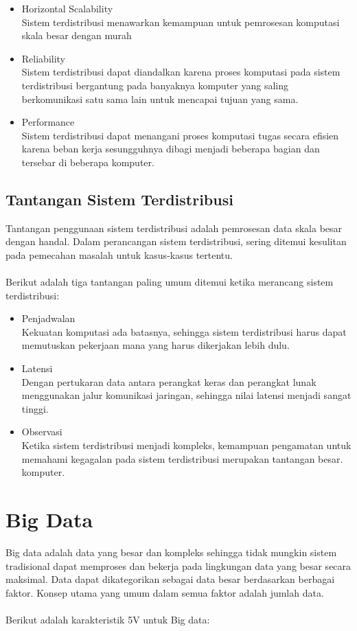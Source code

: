 \begin{itemize}
\item Horizontal Scalability\\
Sistem terdistribusi menawarkan kemampuan untuk  pemrosesan komputasi skala besar dengan murah

\item Reliability\\
Sistem terdistribusi dapat diandalkan karena proses komputasi pada sistem terdistribusi bergantung pada banyaknya komputer yang saling berkomunikasi satu sama lain untuk mencapai tujuan yang sama.
 
\item Performance\\
Sistem terdistribusi dapat menangani proses komputasi tugas secara efisien karena beban kerja sesungguhnya dibagi menjadi beberapa bagian dan tersebar di beberapa komputer. 
\end{itemize}

\subsection{Tantangan Sistem Terdistribusi} 
Tantangan penggunaan sistem terdistribusi adalah pemrosesan data skala besar dengan handal. Dalam perancangan sistem terdistribusi, sering ditemui kesulitan pada pemecahan masalah untuk kasus-kasus tertentu. 
\\\\
Berikut adalah tiga tantangan paling umum ditemui ketika merancang sistem terdistribusi:

\begin{itemize}
\item Penjadwalan\\
Kekuatan komputasi ada batasnya, sehingga sistem terdistribusi harus dapat memutuskan pekerjaan mana yang harus dikerjakan lebih dulu.
\item Latensi\\
Dengan pertukaran data antara perangkat keras dan perangkat lunak menggunakan jalur komunikasi jaringan, sehingga nilai latensi menjadi sangat tinggi. 
\item Observasi\\
Ketika sistem terdistribusi menjadi kompleks, kemampuan pengamatan untuk memahami kegagalan pada sistem terdistribusi merupakan tantangan besar.  komputer. 
\end{itemize}

\newpage
\section{Big Data}
Big data adalah data yang besar dan kompleks sehingga tidak mungkin sistem tradisional dapat memproses dan bekerja pada lingkungan data yang besar secara maksimal. Data dapat dikategorikan sebagai data besar berdasarkan berbagai faktor. Konsep utama yang umum dalam semua faktor  adalah jumlah data.
\\\\
Berikut adalah karakteristik 5V untuk Big data:

